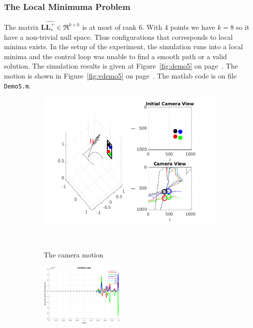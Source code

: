 \documentclass[a4paper,12pt]{article}
\begin{document}
\subsubsection{The Local Minimuma Problem}
The matrix $\mathbf{L} \widehat{\mathbf{L}_s^+} \in \Re^{k \times k}$ is at most of rank 6. With 4 points we 
have $k=8$ so it have a non-trivial null space. Thus configurations that corresponds to local minima exists.
In the setup of the experiment, the simulation runs into  a local minima and the control loop 
was unable to find a smooth path or a valid solution.
The simulation results is given at Figure~\ref{fig:demo5} on page~\pageref{fig:demo5}. The motion is shown in Figure~\ref{fig:vdemo5} on page~\pageref{fig:vdemo5}. The matlab code is on file \texttt{Demo5.m}.
\begin{figure}[tb!]
                 \begin{subfigure}[b]{\textwidth}         
                \centering
                 \includegraphics[width=13cm]{../results/Demo5-simulation.png}
             \caption{The camera motion}
             \vspace~
                 \end{subfigure}
         \begin{subfigure}[b]{0.32\textwidth}
                \centering
                \includegraphics[height=1.2in]{../results/Demo5-control-law.png}

\end{subfigure}
\end{figure}
\end{document}
